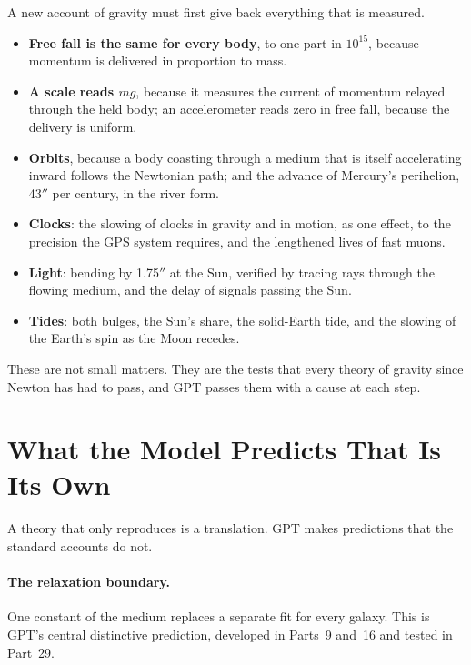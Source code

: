 \documentclass[11pt,a4paper]{article}
\begin{document}
A new account of gravity must first give back everything that is measured. 
\begin{itemize}
\item \textbf{Free fall is the same for every body}, to one part in $10^{15}$, because momentum is delivered in proportion to mass.
\item \textbf{A scale reads $mg$}, because it measures the current of momentum relayed through the held body; an accelerometer reads zero in free fall, because the delivery is uniform.
\item \textbf{Orbits}, because a body coasting through a medium that is itself accelerating inward follows the Newtonian path; and the advance of Mercury's perihelion, 43$''$ per century, in the river form.
\item \textbf{Clocks}: the slowing of clocks in gravity and in motion, as one effect, to the precision the GPS system requires, and the lengthened lives of fast muons.
\item \textbf{Light}: bending by 1.75$''$ at the Sun, verified by tracing rays through the flowing medium, and the delay of signals passing the Sun.
\item \textbf{Tides}: both bulges, the Sun's share, the solid-Earth tide, and the slowing of the Earth's spin as the Moon recedes.
\end{itemize}
These are not small matters. They are the tests that every theory of gravity since Newton has had to pass, and GPT passes them with a cause at each step.

\section{What the Model Predicts That Is Its Own}
\label{sec:own}

A theory that only reproduces is a translation. GPT makes predictions that the standard accounts do not.

\paragraph{The relaxation boundary.}  One constant of the medium replaces a separate fit for every galaxy. This is GPT's central distinctive prediction, developed in Parts~9 and~16 and tested in Part~29.
\end{document}
